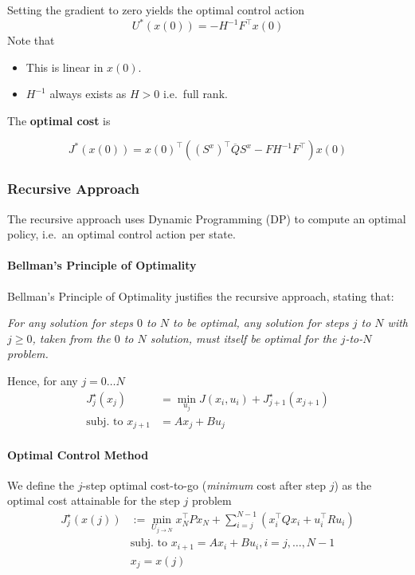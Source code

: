 \newpar{}

Setting the gradient to zero yields the optimal control action
\begin{equation*}
    U^*(x(0)) = -H^{-1}F^\top x(0)
\end{equation*}
Note that
\begin{itemize}
    \item This is linear in $x(0)$.
    \item $H^{-1}$ always exists as $H>0$ i.e.\ full rank.
\end{itemize}

\newpar{}
The \textbf{optimal cost} is

\begin{equation*}
    J^*(x(0)) = {x(0)}^{\top}\left({(S^{x})}^{\top}\overline{Q}S^{x}- F H^{-1} F^\top\right)x(0)
\end{equation*}

\subsubsection{Recursive Approach}
The recursive approach uses Dynamic Programming (DP) to compute an optimal policy, i.e.\ an optimal control action per state.

\paragraph{Bellman's Principle of Optimality}

Bellman's Principle of Optimality justifies the recursive approach, stating that:

\textit{For any solution for steps $0$ to $N$ to be optimal, any solution for steps $j$ to $N$ with $j \geq 0$, taken from the $0$ to $N$ solution, must itself be optimal for the $j$-to-$N$ problem.}

Hence, for any $j=0\dots N$
\begin{align*}
    J_{j}^{\star}(x_{j})     & =\min_{u_{j}}J(x_{i},u_{i})+J_{j+1}^{\star}(x_{j+1}) \\
    \text{subj.\ to }x_{j+1} & =Ax_{j}+Bu_{j}
\end{align*}

\paragraph{Optimal Control Method}


We define the $j$-step optimal cost-to-go (\textit{minimum} cost after step $j$) as the optimal cost attainable for the step $j$ problem
\begin{align*}
    J_j^\star(x(j)) & :=\min_{U_{j\to N}}x_N^\top Px_N+\sum_{i=j}^{N-1}(x_i^\top Qx_i+u_i^\top Ru_i) \\
                    & \text{subj.\ to }x_{i+1}=Ax_i+Bu_i,i=j,\dots,N-1                               \\
                    & x_j=x(j)
\end{align*}

